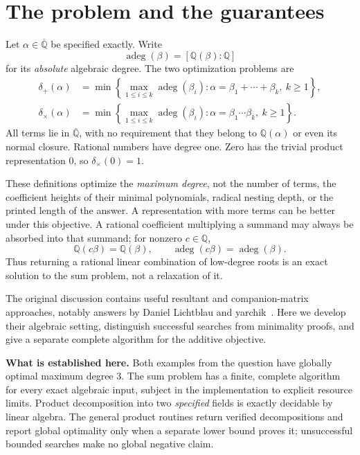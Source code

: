 \documentclass[11pt,letterpaper]{article}
\theoremstyle{definition}\newtheorem{definition}[theorem]{Definition}
\theoremstyle{remark}\newtheorem{remark}[theorem]{Remark}
\newcommand{\Q}{\mathbb Q}
\newcommand{\ad}{\operatorname{adeg}}
\newcommand{\ds}{\delta_{+}}
\newcommand{\dm}{\delta_{\times}}
\begin{document}
\section{The problem and the guarantees}
\label{sec:problem}
Let $\alpha\in\overline{\Q}$ be specified exactly. Write
\[
 \ad(\beta)=[\Q(\beta):\Q]
\]
for its \emph{absolute} algebraic degree. The two optimization problems are
\begin{align}
 \ds(\alpha)&=\min\left\{\max_{1\le i\le k}\ad(\beta_i):
             \alpha=\beta_1+\cdots+\beta_k,\ k\ge1\right\},\label{eq:sumobjective}\\
 \dm(\alpha)&=\min\left\{\max_{1\le i\le k}\ad(\beta_i):
             \alpha=\beta_1\cdots\beta_k,\ k\ge1\right\}.\label{eq:prodobjective}
\end{align}
All terms lie in $\overline{\Q}$, with no requirement that they belong to $\Q(\alpha)$ or even its normal closure. Rational numbers have degree one. Zero has the trivial product representation $0$, so $\dm(0)=1$.

These definitions optimize the \emph{maximum degree}, not the number of terms, the coefficient heights of their minimal polynomials, radical nesting depth, or the printed length of the answer. A representation with more terms can be better under this objective. A rational coefficient multiplying a summand may always be absorbed into that summand; for nonzero $c\in\Q$,
\begin{equation}
 \Q(c\beta)=\Q(\beta),\qquad \ad(c\beta)=\ad(\beta).
 \label{eq:rationalscale}
\end{equation}
Thus returning a rational linear combination of low-degree roots is an exact solution to the sum problem, not a relaxation of it.

The original discussion contains useful resultant and companion-matrix approaches, notably answers by Daniel Lichtblau and yarchik~\cite{se}. Here we develop their algebraic setting, distinguish successful searches from minimality proofs, and give a separate complete algorithm for the additive objective.

\begin{resultbox}
\textbf{What is established here.}
Both examples from the question have globally optimal maximum degree $3$. The sum problem has a finite, complete algorithm for every exact algebraic input, subject in the implementation to explicit resource limits. Product decomposition into two \emph{specified} fields is exactly decidable by linear algebra. The general product routines return verified decompositions and report global optimality only when a separate lower bound proves it; unsuccessful bounded searches make no global negative claim.
\end{resultbox}
\end{document}
